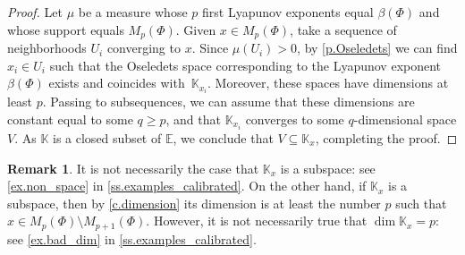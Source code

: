 \documentclass[10pt]{amsart}
\theoremstyle{plain}
\theoremstyle{definition}
\newtheorem{remark}[theorem]{Remark}
\newcommand{\EE}{\mathbb{E}}
\newcommand{\KK}{\mathbb{K}}
\begin{document}
\begin{proof}
Let $\mu$ be a measure whose $p$ first Lyapunov exponents equal $\beta(\Phi)$ and whose support equals $M_p(\Phi)$.
Given $x \in M_p(\Phi)$, take a sequence of neighborhoods $U_i$ converging to $x$.
Since $\mu(U_i)>0$, by \cref{p.Oseledets} we can find $x_i \in U_i$ such that the Oseledets space corresponding to the Lyapunov exponent $\beta(\Phi)$ exists and coincides with~$\KK_{x_i}$. Moreover, these spaces have dimensions at least $p$.
Passing to subsequences, we can assume that these dimensions are constant equal to some $q \ge p$, and that $\KK_{x_i}$ converges to some $q$-dimensional space $V$. As $\KK$ is a closed subset of $\EE$, we conclude that $V \subseteq \KK_x$, completing the proof.
\end{proof}

\begin{remark}\label{r.exceptional_fibers}
It is not necessarily the case that $\KK_x$ is a subspace: see \cref{ex.non_space} in \cref{ss.examples_calibrated}.
On the other hand, if $\KK_x$ is a subspace, then by \cref{c.dimension} its dimension is at least the number $p$ such that $x \in M_p(\Phi) \setminus M_{p+1}(\Phi)$.
However, it is not necessarily true that $\dim \KK_x = p$: see \cref{ex.bad_dim} in \cref{ss.examples_calibrated}.
\end{remark}
\end{document}
